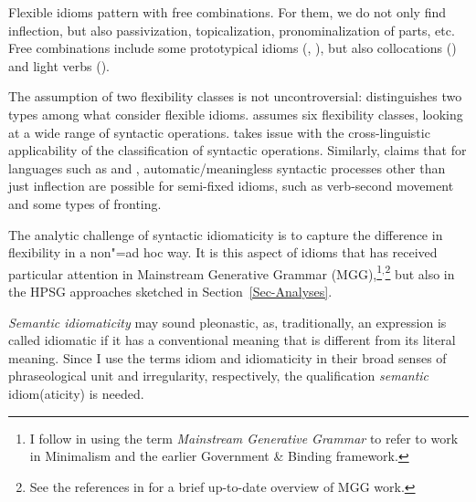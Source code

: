 \documentclass[output=paper
	        ,collection
	        ,collectionchapter
 	        ,biblatex
                ,babelshorthands
                ,newtxmath
                ,draftmode
                ,colorlinks, citecolor=brown
]{langscibook}
\begin{document}
\eal \label{kick-ex} 
\zl 



Flexible idioms pattern with free combinations. For them, we do not only find inflection, but also passivization, topicalization, pronominalization of parts, etc. Free combinations include some prototypical idioms (, ), but also collocations () and light verbs ().

The assumption of two flexibility classes is not uncontroversial: 
\citet{Horn:03} distinguishes two types among what \citet{SBBCF2002a-ausgedruckt} consider flexible idioms. 
\citet{Fraser:70} assumes six flexibility classes, looking at a wide range of syntactic operations.
\citet{Ruwet:91} takes issue with the cross-linguistic applicability of the classification of syntactic operations. Similarly, \citet{Schenk:95} claims that for languages such as  and , automatic/meaningless syntactic processes other than just inflection are possible for semi-fixed idioms, such as verb-second movement and some types of fronting.

The analytic challenge of syntactic idiomaticity is to capture the difference in flexibility in a
non"=ad hoc way. It is this aspect of idioms that has received particular attention in Mainstream
Generative Grammar (MGG),\footnote{%
  I follow \citet[]{CJ2005a} in using the term \emph{Mainstream Generative Grammar} to
  refer to work in Minimalism and the earlier Government \& Binding framework.}$^,$\footnote{See the
  references in \citet{Corver:al:19} for a brief up-to-date overview of MGG work.}
but also in the HPSG approaches sketched in Section~\ref{Sec-Analyses}.

\emph{Semantic idiomaticity} may sound pleonastic, as, traditionally, an expression is called idiomatic if it has a conventional meaning that is different from its literal meaning. 
Since I use the terms idiom and idiomaticity in their broad senses of phraseological unit and irregularity, respectively, the qualification \emph{semantic} idiom(aticity) is needed. 
\end{document}
